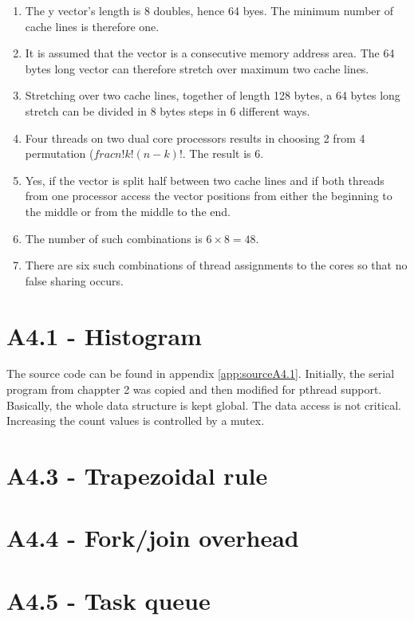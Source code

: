 \documentclass[a4paper,11pt,twoside]{article}
\begin{document}
\begin{enumerate}[label={\alph*)}]
\item The y vector's length is 8 doubles, hence 64 byes. The minimum number of cache lines is therefore one.

\item It is assumed that the vector is a consecutive memory address area. The 64 bytes long vector can therefore stretch over maximum two cache lines.

\item Stretching over two cache lines, together of length 128 bytes, a 64 bytes long stretch can be divided in 8 bytes steps in 6 different ways. 

\item Four threads on two dual core processors results in choosing 2 from 4 permutation ($frac{n!}{k!(n-k)!}$. The result is 6.
\item Yes, if the vector is split half between two cache lines and if both threads from one processor access the vector positions from either the beginning to the middle or from the middle to the end.

\item The number of such combinations is $6 \times 8 = 48$.

\item There are six such combinations of thread assignments to the cores so that no false sharing occurs.

\end{enumerate}

\section{A4.1 - Histogram}
The source code can be found in appendix \ref{app:sourceA4.1}. Initially, the serial program from chappter 2 was copied and then modified for pthread support. Basically, the whole data structure is kept global. The data access is not critical. Increasing the count values is controlled by a mutex.

\section{A4.3 - Trapezoidal rule}

\section{A4.4 - Fork/join overhead}

\section{A4.5 - Task queue} 
\end{document}
